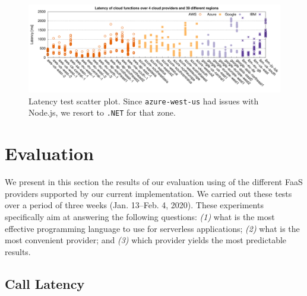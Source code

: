 
\begin{figure}[!t]
\centering
\includegraphics[width=1.0\textwidth]{bilder/latency/latency}
\caption{Latency test scatter plot. Since \texttt{azure-west-us} had issues with Node.js, we resort to \texttt{.NET} for that zone.}
\label{fig:latency_plot}
\end{figure}

\section{Evaluation}
\label{sec:evaluation}

We present in this section the results of our evaluation using \sys of the different FaaS providers supported by our current implementation.
We carried out these tests over a period of three weeks (Jan. 13--Feb. 4, 2020).
These experiments specifically aim at answering the following questions: 
\emph{(1)} what is the most effective programming language to use for serverless applications;
\emph{(2)} what is the most convenient provider; and
\emph{(3)} which provider yields the most predictable results.

%

\subsection{Call Latency}


